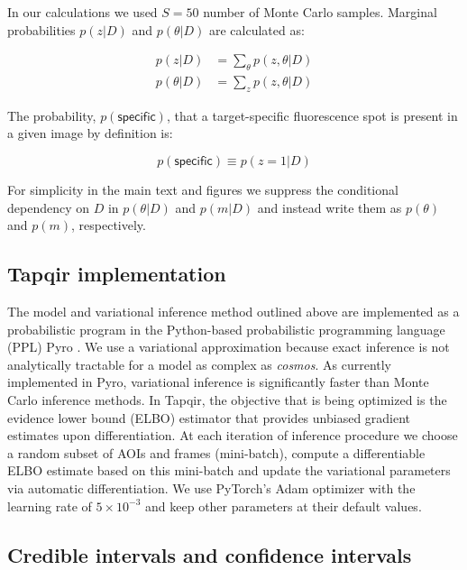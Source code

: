In our calculations we used $S = 50$ number of Monte Carlo samples. Marginal probabilities $p(z | D)$ and $p(\theta | D)$ are calculated as:

\begin{subequations}
\begin{align}
    p(z | D) &= \sum_{\theta} p(z, \theta | D) \\
    p(\theta | D) &= \sum_{z} p(z, \theta | D)
\end{align}
\end{subequations}

The probability, $p(\mathsf{specific})$, that a target-specific fluorescence spot is present in a given image by definition is:

\begin{equation}
    p(\mathsf{specific}) \equiv p(z = 1 | D)
\end{equation}

For simplicity in the main text and figures we suppress the conditional dependency on $D$ in $p(\theta | D)$ and $p(m | D)$ and instead write them as $p(\theta)$ and $p(m)$, respectively.

\subsection{Tapqir implementation}

The model and variational inference method outlined above are implemented as a probabilistic program in the Python-based probabilistic programming language (PPL) Pyro \citep{Foerster2018-kd,Bingham2019-qy,Obermeyer2019-xt}. We use a variational approximation because exact inference is not analytically tractable for a model as complex as \emph{cosmos}. As currently implemented in Pyro, variational inference is significantly faster than Monte Carlo inference methods. In Tapqir, the objective that is being optimized is the evidence lower bound (ELBO) estimator that provides unbiased gradient estimates upon differentiation. At each iteration of inference procedure we choose a random subset of AOIs and frames (mini-batch), compute a differentiable ELBO estimate based on this mini-batch and update the variational parameters via automatic differentiation. We use PyTorch's Adam optimizer \citep{Kingma2014-cz} with the learning rate of $5\times 10^{-3}$ and keep other parameters at their default values. 


\subsection{Credible intervals and confidence intervals}

